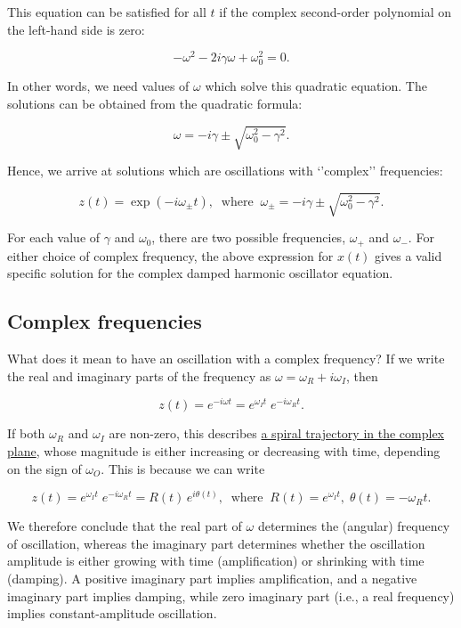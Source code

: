 \documentclass[11pt]{article}
\begin{document}
This equation can be satisfied for all \(t\) if the complex second-order
polynomial on the left-hand side is zero:

\[-\omega^2 - 2i\gamma \omega + \omega_0^2 = 0.\]

In other words, we need values of \(\omega\) which solve this quadratic
equation. The solutions can be obtained from the quadratic formula:

\[\omega = -i\gamma \pm \sqrt{\omega_0^2 - \gamma^2}.\]

Hence, we arrive at solutions which are oscillations with `'complex''
frequencies:

\[z(t) = \exp\left(-i\omega_\pm t\right), \;\;\mathrm{where}\;\; \omega_\pm = -i\gamma \pm \sqrt{\omega_0^2 - \gamma^2}.\]

For each value of \(\gamma\) and \(\omega_0\), there are two possible
frequencies, \(\omega_+\) and \(\omega_-\). For either choice of complex
frequency, the above expression for \(x(t)\) gives a valid specific
solution for the complex damped harmonic oscillator equation.

    \subsection{Complex frequencies}\label{complex-frequencies}

What does it mean to have an oscillation with a complex frequency? If we
write the real and imaginary parts of the frequency as
\(\omega = \omega_R + i \omega_I\), then

\[z(t) = e^{-i\omega t} = e^{\omega_I t} \; e^{-i\omega_R t}.\]

If both \(\omega_R\) and \(\omega_I\) are non-zero, this describes
\href{03_complex_numbers.ipynb\#complex_spiral}{a spiral trajectory in
the complex plane}, whose magnitude is either increasing or decreasing
with time, depending on the sign of \(\omega_O\). This is because we can
write

\[z(t) = e^{\omega_I t} \; e^{-i\omega_R t} = R(t)\, e^{i\theta(t)}, \;\;\mathrm{where}\;\;R(t) = e^{\omega_I t}, \; \theta(t) = -\omega_R t.\]

We therefore conclude that the real part of \(\omega\) determines the
(angular) frequency of oscillation, whereas the imaginary part
determines whether the oscillation amplitude is either growing with time
(amplification) or shrinking with time (damping). A positive imaginary
part implies amplification, and a negative imaginary part implies
damping, while zero imaginary part (i.e., a real frequency) implies
constant-amplitude oscillation.
\end{document}
